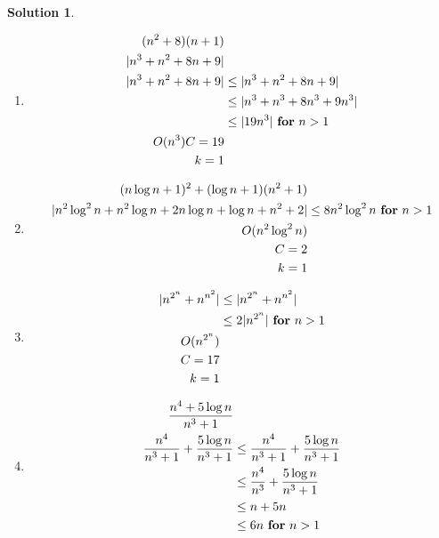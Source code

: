 \documentclass{article}
\theoremstyle{plain}
\theoremstyle{break}
\newtheorem{solution}{Solution}
\begin{document}
\begin{solution}
\begin{enumerate}

\item \begin{equation}
\begin{split}
(n^2+8)(n+1) & \\
|n^3 + n^2 + 8n + 9| & \\
|n^3 + n^2 + 8n + 9| & \leq |n^3 + n^2 + 8n + 9| \\
& \leq |n^3 + n^3 + 8n^3 + 9n^3| \\
& \leq |19n^3| \textnormal{ \textbf{for} } n > 1 \\
O(n^3)
C = 19 \\
k = 1
\end{split} 
\end{equation}
\item \begin{equation}
\begin{split}
(n\log{n} + 1)^2+(\log{n}+1)(n^2+1) &\\
|n^2 \log^2{n} + n^2 \log{n} + 2 n \log{n} + \log{n} + n^2 + 2| & \leq 8n^2\log^2{n} \textnormal{ \textbf{for} } n > 1 \\
O(n^2\log^2{n}) \\
C = 2 \\
k = 1
\end{split} 
\end{equation}
\item \begin{equation}
\begin{split}
|n^{2^n}+n^{n^2}| & \leq |n^{2^n}+n^{n^2}| \\
& \leq 2|n^{2^n}| \textnormal{ \textbf{for} } n > 1 \\
O(n^{2^n}) \\
C = 17 \\
k = 1
\end{split} 
\end{equation}
\item \begin{equation}
\begin{split}
\displaystyle \frac{n^4+5\log{n}}{n^3+1} & \\
\frac{n^4}{n^3+1}+\frac{5\log{n}}{n^3+1} & \leq \frac{n^4}{n^3+1}+\frac{5\log{n}}{n^3+1} \\
& \leq \frac{n^4}{n^3}+\frac{5\log{n}}{n^3+1} \\
& \leq n + 5n \\
& \leq 6n\textnormal{ \textbf{for} } n > 1 \\

\end{split}
\end{equation}
\end{enumerate}
\end{solution}
\end{document}
